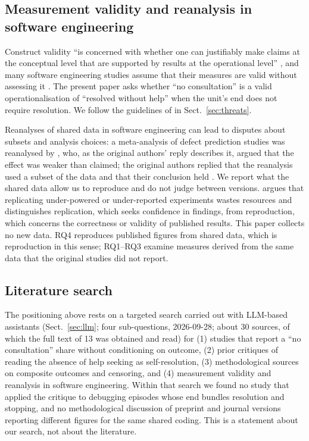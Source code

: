 \documentclass[pdflatex,sn-basic]{sn-jnl}
\begin{document}
\subsection{Measurement validity and reanalysis in software engineering}

Construct validity ``is concerned with whether one can justifiably make claims at the conceptual level that are supported by results at the operational level'' \citep{sjoberg2023}, and many software engineering studies assume that their measures are valid without assessing it \citep{ralph2018}. The present paper asks whether ``no consultation'' is a valid operationalisation of ``resolved without help'' when the unit's end does not require resolution. We follow the guidelines of \citet{sjoberg2023} in Sect.~\ref{sec:threats}.

Reanalyses of shared data in software engineering can lead to disputes about subsets and analysis choices: a meta-analysis of defect prediction studies \citep{shepperd2014} was reanalysed by \citet{tantithamthavorn2016}, who, as the original authors' reply describes it, argued that the effect was weaker than claimed; the original authors replied that the reanalysis used a subset of the data and that their conclusion held \citep{shepperd2018reply}. We report what the shared data allow us to reproduce and do not judge between versions. \citet{shepperd2018replication} argues that replicating under-powered or under-reported experiments wastes resources and distinguishes replication, which seeks confidence in findings, from reproduction, which concerns the correctness or validity of published results. This paper collects no new data. RQ4 reproduces published figures from shared data, which is reproduction in this sense; RQ1--RQ3 examine measures derived from the same data that the original studies did not report.

\subsection{Literature search}

The positioning above rests on a targeted search carried out with LLM-based assistants (Sect.~\ref{sec:llm}; four sub-questions, 2026-09-28; about 30 sources, of which the full text of 13 was obtained and read) for (1) studies that report a ``no consultation'' share without conditioning on outcome, (2) prior critiques of reading the absence of help seeking as self-resolution, (3) methodological sources on composite outcomes and censoring, and (4) measurement validity and reanalysis in software engineering. Within that search we found no study that applied the critique to debugging episodes whose end bundles resolution and stopping, and no methodological discussion of preprint and journal versions reporting different figures for the same shared coding. This is a statement about our search, not about the literature.
\end{document}
